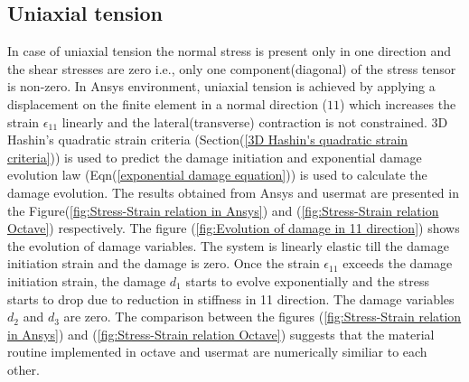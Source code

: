 \documentclass[a4paper,12pt]{extarticle}
\begin{document}
\subsection{Uniaxial tension}
\indent\indent\indent In case of uniaxial tension the normal stress is present only in one direction and the shear stresses are zero i.e., only one component(diagonal) of the stress tensor is non-zero.  In Ansys environment, uniaxial tension is achieved by applying a displacement on the finite element in a normal direction ($11$) which increases the strain $\epsilon_{11}$ linearly and the lateral(transverse) contraction is not constrained. 3D Hashin's quadratic strain criteria (Section(\ref{3D Hashin's quadratic strain criteria})) is used to predict the damage initiation and exponential damage evolution law (Eqn(\ref{exponential damage equation})) is used to calculate the damage evolution. The results obtained from Ansys and usermat are presented in the Figure(\ref{fig:Stress-Strain relation in Ansys}) and (\ref{fig:Stress-Strain relation Octave}) respectively. The figure (\ref{fig:Evolution of damage in 11 direction}) shows the evolution of damage variables.  The system is linearly elastic till the damage initiation strain and the damage is zero. Once the strain $\epsilon_{11}$ exceeds the damage initiation strain, the damage $d_{1}$ starts to evolve exponentially and the stress starts to drop due to reduction in stiffness in 11 direction.  The damage variables $d_{2}$ and $d_{3}$ are zero. The comparison between the figures (\ref{fig:Stress-Strain relation in Ansys}) and (\ref{fig:Stress-Strain relation Octave}) suggests that the material routine implemented in octave and usermat are numerically similiar to each other. \\
\\
\end{document}
